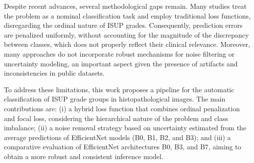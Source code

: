 Despite recent advances, several methodological gaps remain. Many studies treat the problem as a nominal classification task and employ traditional loss functions, disregarding the ordinal nature of ISUP grades. Consequently, prediction errors are penalized uniformly, without accounting for the magnitude of the discrepancy between classes, which does not properly reflect their clinical relevance. Moreover, many approaches do not incorporate robust mechanisms for noise filtering or uncertainty modeling, an important aspect given the presence of artifacts and inconsistencies in public datasets.

To address these limitations, this work proposes a pipeline for the automatic classification of ISUP grade groups in histopathological images. The main contributions are: (i) a hybrid loss function that combines ordinal penalization and focal loss, considering the hierarchical nature of the problem and class imbalance; (ii) a noise removal strategy based on uncertainty estimated from the average predictions of EfficientNet models (B0, B1, B2, and B3); and (iii) a comparative evaluation of EfficientNet architectures B0, B3, and B7, aiming to obtain a more robust and consistent inference model.